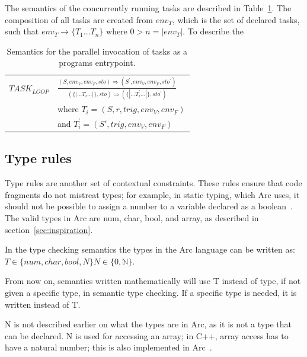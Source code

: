 The semantics of the concurrently running tasks are described in Table~\ref{tab:taskinvocation}. The composition of all tasks are created from $env_T$, which is the set of declared tasks, such that $env_T \rightarrow \{T_1 \dots T_n \}$ where $0 > n = |env_T|$. To describe the


\begin{table}[htb!]
    \centering
    \begin{tabular}{ll}
        \toprule
        $TASK_{LOOP}$ & $\frac
            {(S, env_V, env_F, sto) \Rightarrow (S^\prime, env_V, env_F, sto^\prime)}
            {(\{|\dots T_i \dots|\}, sto) \Rightarrow (\{|\dots T^\prime_i \dots |\}, sto^\prime)}$ \\ [12pt]
                      & where $T_i = (S, r, trig, env_V, env_F)$                                    \\
                      & and $T^\prime_i = (S\prime, trig, env_V, env_F) $                           \\
        \bottomrule
    \end{tabular}
    \caption{Semantics for the parallel invocation of tasks as a programs entrypoint.}
    \label{tab:taskinvocation}
\end{table}



\subsection{Type rules}\label{subsec:typerules}
Type rules are another set of contextual constraints. These rules ensure that code fragments do not mistreat types; for example, in static typing, which Arc uses, it should not be possible to assign a number to a variable declared as a boolean~\cite{Sebesta2016}. The valid types in Arc are num, char, bool, and array, as described in section~\ref{sec:inspiration}.

In the type checking semantics the types in the Arc language can be written as:
$T \in \{num, char, bool, N\} N \in \{ 0,\mathbb{N}\}$.


From now on, semantics written mathematically will use T instead of type, if not given a specific type, in semantic type checking. If a specific type is needed, it is written instead of T.

N is not described earlier on what the types are in Arc, as it is not a type that can be declared. N is used for accessing an array; in C++, array access has to have a natural number; this is also implemented in Arc~\cite{cppreferenceDataTypes}.



